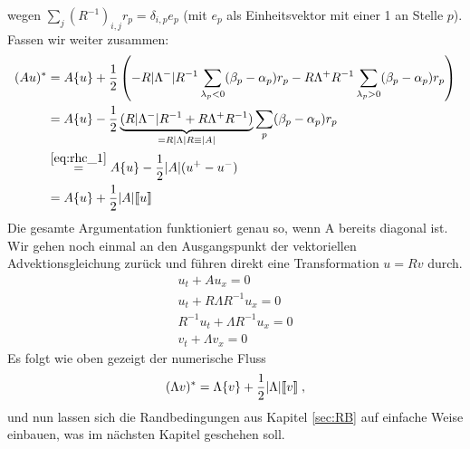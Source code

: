 wegen $\sum_j (R^{-1})_{i,j} r_p = \delta_{i,p} e_p$ (mit $e_p$ als Einheitsvektor mit einer 1 an Stelle $p$). Fassen wir weiter zusammen:
\begin{align}
  (Au)^* &= A \{ u \} + \frac{1}{2} \left( -R|\Lambda^-|R^{-1} \sum_{\lambda_p < 0} (\beta_p - \alpha_p)r_p
              - R\Lambda^+R^{-1} \sum_{\lambda_p > 0} (\beta_p - \alpha_p)r_p        \right) \\
        &= A \{ u \} - \frac{1}{2} \underbrace{(R|\Lambda^-|R^{-1} + R\Lambda^+R^{-1})}_{=R|\Lambda|R \equiv |A|}  \sum_p(\beta_p - \alpha_p)r_p   \\
        &\stackrel{\eqref{eq:rhc_1}}{=} A \{ u \} - \frac{1}{2} |A| (u^+-u^-) \\
        &= A \{ u \} + \frac{1}{2} |A| \llbracket u \rrbracket
\end{align}
Die gesamte Argumentation funktioniert genau so, wenn A bereits diagonal ist. Wir gehen noch einmal an den Ausgangspunkt der vektoriellen Advektionsgleichung zurück und führen direkt eine Transformation $u=Rv$ durch.
\begin{align}
  u_t + A u_x = 0\\
  u_t + R\Lambda R^{-1} u_x = 0 \\
  R^{-1} u_t + \Lambda R^{-1} u_x = 0 \\
  v_t + \Lambda v_x = 0
\end{align}
Es folgt wie oben gezeigt der numerische Fluss
\begin{align}
  (\Lambda v)^* = \Lambda\{ v \} + \frac{1}{2}|\Lambda|\llbracket v \rrbracket \; ,
  \label{eq:FLUX}
\end{align}
und nun lassen sich die Randbedingungen aus Kapitel \ref{sec:RB} auf einfache Weise einbauen, was im nächsten Kapitel geschehen soll.




